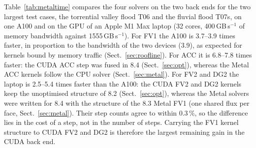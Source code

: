 \documentclass[draft,linenumbers]{agujournal2025}
\begin{document}
Table~\ref{tab:metaltime} compares the four solvers on the two back ends
for the two largest test cases, the torrential valley flood T06 and the
fluvial flood T07s, on one A100 and on the GPU of an Apple M1 Max laptop (32 cores, 400\,GB\,s$^{-1}$ of memory bandwidth against
1555\,GB\,s$^{-1}$). For FV1 the A100 is 3.7--3.9 times faster, in
proportion to the bandwidth of the two devices (3.9), as expected for kernels
bound by memory traffic (Sect.~\ref{sec:roofline}). For ACC it is 6.8--7.8
times faster: the CUDA ACC step was fused in 8.4 (Sect.~\ref{sec:opt}),
whereas the Metal ACC kernels follow the CPU solver (Sect.~\ref{sec:metal}).
For FV2 and DG2 the laptop is
2.5--5.4 times faster than the A100: the CUDA FV2 and DG2 kernels keep the
unoptimised structure of 8.2 (Sect.~\ref{sec:opt}), whereas the Metal
solvers were written for 8.4
with the structure of the 8.3 Metal FV1 (one shared flux per face,
Sect.~\ref{sec:metal}). Their step counts agree to within 0.3\,\%, so the
difference lies in the cost of a step, not in the number of steps. Carrying
the FV1 kernel structure to CUDA FV2 and DG2 is therefore the largest
remaining gain in the CUDA back end.

\begin{table}[t]
\centering\small
\caption{Wall-clock time of the solver process (reading, simulation, writing)
for the same case and solver on one NVIDIA A100 (CUDA) and on an Apple M1
Max (Metal), single precision; time per step in milliseconds; ratio of the M1
Max time to the A100 time. Steps: A100 (M1 Max within 0.3\,\%). T06:
Environment Agency test 5, torrential valley flood, 1.7 million cells, 30\,h.
T07s: Carlisle 2005, fluvial flood, 0.58 million cells, first 6\,h. CUDA ACC
and FV1 are the solvers optimised in 8.4; CUDA FV2 and DG2 keep the
unoptimised kernels of 8.2 (Sect.~\ref{sec:opt}).}
\label{tab:metaltime}
\end{table}
\end{document}
